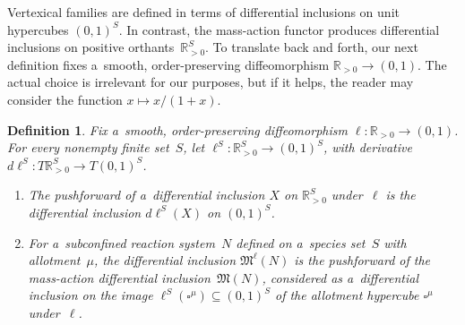 \documentclass[pdftex]{sigma}
\newtheorem{Definition}[Theorem]{Definition}
\begin{document}
Vertexical families are def\/ined in terms of dif\/ferential inclusions on unit hypercubes $(0,1)^S$.
In contrast, the mass-action functor produces dif\/ferential inclusions on positive orthants~$\mathbb{R}_{>0}^S$.
To translate back and forth, our next def\/inition f\/ixes a~smooth, order-preserving dif\/feomorphism
$\mathbb{R}_{>0}\to(0,1)$.
The actual choice is irrelevant for our purposes, but if it helps, the reader may consider the function $x\mapsto
x/(1+x)$.
\begin{Definition}
\label{d:ell}
Fix a~smooth, order-preserving dif\/feomorphism $\ell:\mathbb{R}_{>0}\to(0,1)$.
For every nonempty f\/inite set~$S$, let $\ell^S:\mathbb{R}_{>0}^S\to(0,1)^S$, with derivative
$d\ell^S:T\mathbb{R}_{>0}^S\to T(0,1)^S$.
\begin{enumerate}\itemsep=0pt
\item The \emph{pushforward} of a~dif\/ferential inclusion $X$ on $\mathbb{R}_{>0}^S$ \emph{under~$\ell$} is the
dif\/ferential inclusion $d\ell^S(X)$ on $(0,1)^S$.

\item For a~subconf\/ined reaction system~$N$ def\/ined on a~species set~$S$ with allotment~$\mu$, the dif\/ferential
inclusion $\mathfrak M^\ell(N)$ is the pushforward of the mass-action dif\/ferential inclusion~$\mathfrak M(N)$,
considered as a~dif\/ferential inclusion on the image $\ell^S(\square^\mu)\subseteq(0,1)^S$ of the allotment hypercube
$\square^\mu$ under~$\ell$.
\end{enumerate}
\end{Definition}
\end{document}
